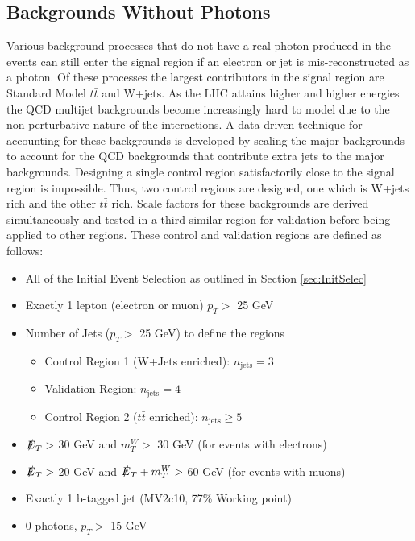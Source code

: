 \subsection{Backgrounds Without Photons}
\label{sec:BKGnoPho}
Various background processes that do not have a real photon produced in the events can still enter the signal region if an electron or jet is mis-reconstructed as a photon.  Of these processes the largest contributors in the signal region are Standard Model $t\bar{t}$ and W+jets.  As the LHC attains higher and higher energies the QCD multijet backgrounds become increasingly hard to model due to the non-perturbative nature of the interactions.  A data-driven technique for accounting for these backgrounds is developed by scaling the major backgrounds to account for the QCD backgrounds that contribute extra jets to the major backgrounds.  Designing a single control region satisfactorily close to the signal region is impossible.  Thus, two control regions are designed, one which is W+jets rich and the other $t\bar{t}$ rich.  Scale factors for these backgrounds are derived simultaneously and tested in a third similar region for validation before being applied to other regions.  
These control and validation regions are defined as follows:
\begin{itemize}
\item All of the Initial Event Selection as outlined in Section \ref{sec:InitSelec}
\item Exactly 1 lepton (electron or muon) $p_T >$ 25 GeV
\item Number of Jets  ($p_T >$ 25 GeV) to define the regions
	\begin{itemize}
	\item Control Region 1 (W+Jets enriched): $n_{\text{jets}} = 3$
	\item Validation Region: $n_{\text{jets}} =4$
	\item Control Region 2 ($t\bar{t}$ enriched): $n_{\text{jets}} \geq 5$
	\end{itemize}
\item $\slashed{E}_T >$ 30 GeV and $m_T^W >$ 30 GeV (for events with electrons)
\item $\slashed{E}_T >$ 20 GeV and $\slashed{E}_T + m_T^W >$ 60 GeV (for events with muons)
\item Exactly 1 b-tagged jet (MV2c10, 77\% Working point)
\item 0 photons, $p_T >$ 15 GeV
\end{itemize}


